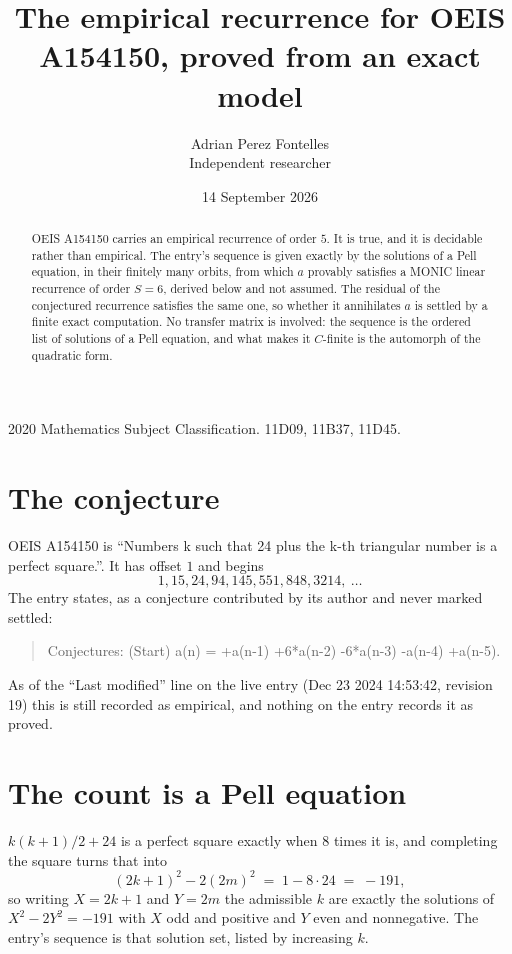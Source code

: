 \documentclass[11pt,a4paper]{article}
\title{The empirical recurrence for OEIS A154150, proved from an exact model}
\author{Adrian Perez Fontelles\\ \small Independent researcher}
\date{14 September 2026}
\theoremstyle{plain}
\theoremstyle{definition}
\begin{document}
\maketitle

\begin{abstract}
OEIS A154150 carries an empirical recurrence of order $5$. It is true, and it is
decidable rather than empirical. The entry's sequence is given exactly by the solutions of a Pell equation, in their finitely many orbits, from
which $a$ provably satisfies a MONIC linear recurrence of order $S=6$, derived below and not
assumed. The residual of the conjectured recurrence satisfies the same one, so whether it
annihilates $a$ is settled by a finite exact computation. No transfer matrix is involved: the sequence is the ordered list of solutions of a Pell equation, and what makes it $C$-finite is the automorph of the quadratic form.
\end{abstract}

\noindent\small 2020 Mathematics Subject Classification. 11D09, 11B37, 11D45.\normalsize

\section{The conjecture}

OEIS A154150 is ``Numbers k such that 24 plus the k-th triangular number is a perfect square.''. It has offset $1$ and begins
\[
1, 15, 24, 94, 145, 551, 848, 3214,\ \dots
\]
The entry states, as a conjecture contributed by its author and never marked settled:
\begin{quote}
Conjectures: (Start) a(n) = +a(n-1) +6*a(n-2) -6*a(n-3) -a(n-4) +a(n-5).
\end{quote}
As of the ``Last modified'' line on the live entry (Dec 23 2024 14:53:42, revision 19)
this is still recorded as empirical, and nothing on the entry records it as proved.

\section{The count is a Pell equation}

$k(k+1)/2 + 24$ is a perfect square exactly when $8$ times it is, and completing the square
turns that into
\[
(2k+1)^2-2(2m)^2\;=\;1-8\cdot24\;=\;-191,
\]
so writing $X=2k+1$ and $Y=2m$ the admissible $k$ are exactly the solutions of $X^2-2Y^2=-191$
with $X$ odd and positive and $Y$ even and nonnegative. The entry's sequence is that solution
set, listed by increasing $k$.
\end{document}
